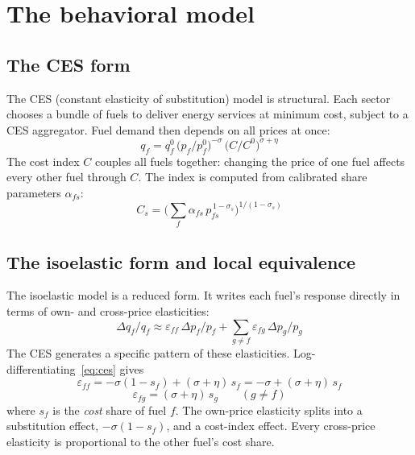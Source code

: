 \documentclass[11pt,a4paper]{article}
\begin{document}
\newpage
\section{The behavioral model}\label{sec:behavior}

\subsection{The CES form}

The CES (constant elasticity of substitution) model is structural. Each sector chooses a bundle of fuels to deliver energy services at minimum cost, subject to a CES aggregator. Fuel demand then depends on all prices at once:
\begin{equation}\label{eq:ces}
q_f = q_f^0\,\big(p_f/p_f^0\big)^{-\sigma}\,\big(C/C^0\big)^{\sigma+\eta}
\end{equation}
The cost index $C$ couples all fuels together: changing the price of one fuel affects every other fuel through $C$. The index is computed from calibrated share parameters $\alpha_{fs}$:
\begin{equation}\label{eq:costindex}
C_s = \Big(\textstyle\sum_f \alpha_{fs}\,p_{fs}^{\,1-\sigma_s}\Big)^{1/(1-\sigma_s)}
\end{equation}

\subsection{The isoelastic form and local equivalence}

The isoelastic model is a reduced form. It writes each fuel's response directly in terms of own- and cross-price elasticities:
\begin{equation}\label{eq:iso}
\Delta q_f/q_f \approx \varepsilon_{ff}\,\Delta p_f/p_f + \textstyle\sum_{g\neq f}\varepsilon_{fg}\,\Delta p_g/p_g
\end{equation}
The CES generates a specific pattern of these elasticities. Log-differentiating~\eqref{eq:ces} gives
\begin{equation}\label{eq:own}
\varepsilon_{ff} = -\sigma(1-s_f) + (\sigma+\eta)\,s_f = -\sigma + (\sigma+\eta)\,s_f
\end{equation}
\begin{equation}\label{eq:cross}
\varepsilon_{fg} = (\sigma+\eta)\,s_g \qquad (g \neq f)
\end{equation}
where $s_f$ is the \emph{cost} share of fuel $f$. The own-price elasticity splits into a substitution effect, $-\sigma(1-s_f)$, and a cost-index effect. Every cross-price elasticity is proportional to the other fuel's cost share.
\end{document}
